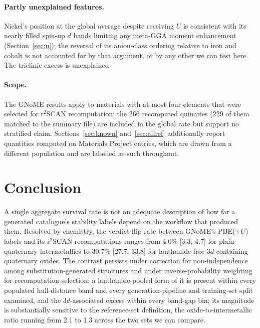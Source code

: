 \documentclass[11pt]{article}
\begin{document}
\paragraph{Partly unexplained features.} Nickel's position at the global average
despite receiving $U$ is consistent with its nearly filled spin-up $d$ bands limiting any meta-GGA moment
enhancement (Section~\ref{sec:u}); the reversal of its anion-class ordering
relative to iron and cobalt is not accounted for by that argument, or by any other we can
test here. The triclinic excess is unexplained.

\paragraph{Scope.} The GNoME results apply to materials with at most four elements that
were selected for r$^2$SCAN recomputation; the 266 recomputed quinaries (229 of them matched to the summary file) are included in
the global rate but support no stratified claim. Sections~\ref{sec:known} and~\ref{sec:allref} additionally report quantities computed on Materials Project entries,
which are drawn from a different population and are labelled as such throughout.

\section{Conclusion}

A single aggregate survival rate is not an adequate description of how far a generated
catalogue's stability labels depend on the workflow that produced them. Resolved by
chemistry, the verdict-flip rate between GNoME's PBE(+$U$) labels and its r$^2$SCAN
recomputations ranges from 4.0\% [3.3, 4.7] for plain quaternary intermetallics to
30.7\% [27.7, 33.8] for lanthanide-free 3$d$-containing quaternary oxides. The contrast
persists under correction for non-independence among substitution-generated structures
and under inverse-probability weighting for recomputation selection; a
lanthanide-pooled form of it is present within every populated hull-distance band and
every generation-pipeline and training-set split examined, and the 3$d$-associated excess
within every band-gap bin; its magnitude is
substantially sensitive to the reference-set definition, the oxide-to-intermetallic
ratio running from 2.1 to 1.3 across the two sets we can compare.
\end{document}
